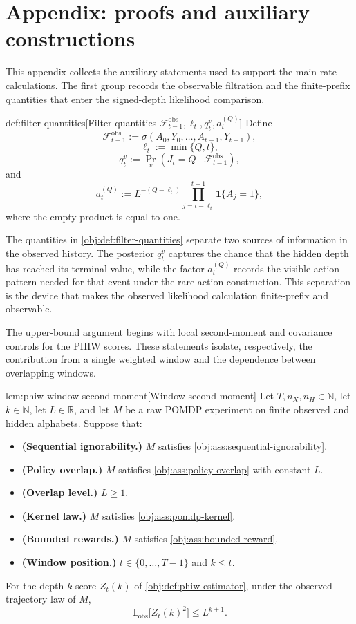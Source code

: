 \section{Appendix: proofs and auxiliary constructions}

This appendix collects the auxiliary statements used to support the main rate calculations. The first group records the observable filtration and the finite-prefix quantities that enter the signed-depth likelihood comparison.

\begin{definitionv}{def:filter-quantities}[Filter quantities \(\mathcal F_{t-1}^{\mathrm{obs}},\ell_t,q_t^v,a_t^{(Q)}\)]
Define
\[
\mathcal F_{t-1}^{\mathrm{obs}}
:=
\sigma(A_0,Y_0,\ldots,A_{t-1},Y_{t-1}),
\]
\[
\ell_t:=\min\{Q,t\},
\]
\[
q_t^v
:=
\Pr_v(J_t=Q\mid\mathcal F_{t-1}^{\mathrm{obs}}),
\]
and
\[
a_t^{(Q)}
:=
L^{-(Q-\ell_t)}
\prod_{j=t-\ell_t}^{t-1}\mathbf 1\{A_j=1\},
\]
where the empty product is equal to one.
\end{definitionv}

The quantities in \cref{obj:def:filter-quantities} separate two sources of information in the observed history. The posterior \(q_t^v\) captures the chance that the hidden depth has reached its terminal value, while the factor \(a_t^{(Q)}\) records the visible action pattern needed for that event under the rare-action construction. This separation is the device that makes the observed likelihood calculation finite-prefix and observable.

The upper-bound argument begins with local second-moment and covariance controls for the PHIW scores. These statements isolate, respectively, the contribution from a single weighted window and the dependence between overlapping windows.

\begin{lemmav}{lem:phiw-window-second-moment}[Window second moment]
Let \(T,n_X,n_H\in\mathbb N\), let \(k\in\mathbb N\), let \(L\in\mathbb R\), and let \(M\) be a raw POMDP experiment on finite observed and hidden alphabets. Suppose that:
\begin{itemize}
\item \textbf{(Sequential ignorability.)} \(M\) satisfies \cref{obj:ass:sequential-ignorability}.
\item \textbf{(Policy overlap.)} \(M\) satisfies \cref{obj:ass:policy-overlap} with constant \(L\).
\item \textbf{(Overlap level.)} \(L\ge 1\).
\item \textbf{(Kernel law.)} \(M\) satisfies \cref{obj:ass:pomdp-kernel}.
\item \textbf{(Bounded rewards.)} \(M\) satisfies \cref{obj:ass:bounded-reward}.
\item \textbf{(Window position.)} \(t\in\{0,\ldots,T-1\}\) and \(k\le t\).
\end{itemize}
For the depth-\(k\) score \(Z_t(k)\) of \cref{obj:def:phiw-estimator}, under the observed trajectory law of \(M\),
\[
\mathbb E_{\mathrm{obs}}\bigl[Z_t(k)^2\bigr]\le L^{k+1}.
\]
\end{lemmav}

